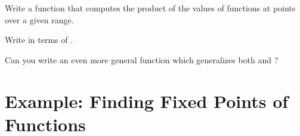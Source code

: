\begin{exercise}
Write a function  that computes the product of the
values of functions at points over a given range.
\end{exercise}

\begin{exercise}
Write  in terms of .
\end{exercise}

\begin{exercise}
Can you write an even more general function which generalizes both
 and ?
\end{exercise}

\section{Example: Finding Fixed Points of Functions}

